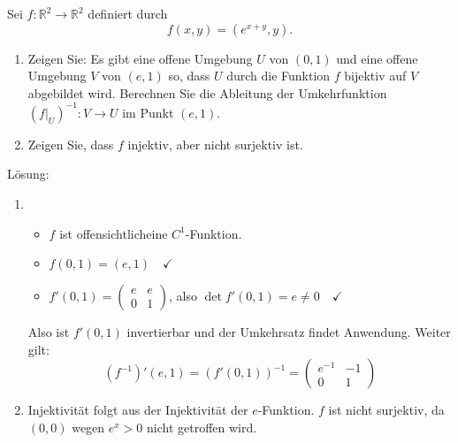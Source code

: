 \documentclass[parskip=full]{scrartcl}
\begin{document}
Sei $f : \mathbb{R}^2 \to \mathbb{R}^2$ definiert durch
\begin{displaymath}
  f(x,y) = (e^{x + y}, y).
\end{displaymath}
\begin{enumerate}
    \item Zeigen Sie:
    Es gibt eine offene Umgebung $U$ von $(0,1)$ und eine offene Umgebung $V$ von $(e,1)$ so, dass $U$ durch die Funktion $f$ bijektiv auf $V$ abgebildet wird.
    Berechnen Sie die Ableitung der Umkehrfunktion $(f|_U)^{-1} : V \to U$ im Punkt $(e,1)$.
    \item Zeigen Sie, dass $f$ injektiv, aber nicht surjektiv ist.
\end{enumerate}
Lösung: 
\begin{enumerate}
    \item
    \begin{itemize}
        \item $f$ ist offensichtlicheine $C^1$-Funktion.
        \item $f(0,1) = (e,1) \quad \checkmark$
        \item $f'(0,1) = \begin{pmatrix} e & e\\ 0 & 1\end{pmatrix}$, also $\det f'(0,1) = e \neq 0 \quad \checkmark$
    \end{itemize}
    Also ist $f'(0,1)$ invertierbar und der Umkehrsatz findet Anwendung.
    Weiter gilt:
    \begin{displaymath}
      (f^{-1})'(e, 1) = (f'(0,1))^{-1} =
      \begin{pmatrix}
        e^{-1} & -1\\
        0 & 1
     \end{pmatrix}
    \end{displaymath}
    \item Injektivität folgt aus der Injektivität der $e$-Funktion.
    $f$ ist nicht surjektiv, da $(0,0)$ wegen $e^x > 0$ nicht getroffen wird.
\end{enumerate}
\end{document}
